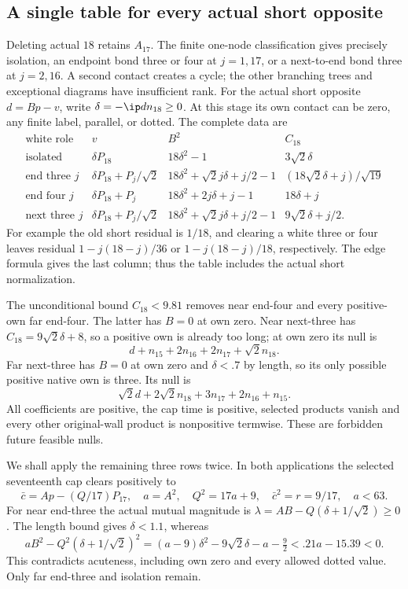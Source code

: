 \subsection{A single table for every actual short opposite}
\label{app:B18shorttable}
Deleting actual \(18\) retains \(A_{17}\).
The finite one-node classification gives precisely isolation, an
endpoint bond three or four at \(j=1,17\), or a next-to-end bond
three at \(j=2,16\). A second contact creates a cycle; the other
branching trees and exceptional diagrams have insufficient rank.
For the actual short opposite \(d=Bp-v\), write
\(\delta=-\ip d{n_{18}}\geq0\). At this stage its own contact
can be zero, any finite label, parallel, or dotted. The complete data are
\[
\begin{array}{c|c|c|c}
\text{white role}&v&B^2&C_{18}\\ \hline
\text{isolated}&\delta P_{18}&18\delta^2-1&3\sqrt2\delta\\
\text{end three }j&\delta P_{18}+P_j/\sqrt2&
18\delta^2+\sqrt2j\delta+j/2-1&
(18\sqrt2\delta+j)/\sqrt{19}\\
\text{end four }j&\delta P_{18}+P_j&
18\delta^2+2j\delta+j-1&18\delta+j\\
\text{next three }j&\delta P_{18}+P_j/\sqrt2&
18\delta^2+\sqrt2j\delta+j/2-1&9\sqrt2\delta+j/2 .
\end{array}
\]
For example the old short residual is \(1/18\), and clearing a
white three or four leaves residual
\(1-j(18-j)/36\) or \(1-j(18-j)/18\), respectively.
The edge formula gives the last column; thus the table includes
the actual short normalization.

The unconditional bound \(C_{18}<9.81\) removes near end-four
and every positive-own far end-four. The latter has \(B=0\)
at own zero. Near next-three has \(C_{18}=9\sqrt2\delta+8\),
so a positive own is already too long; at own zero its null is
\[
 d+n_{15}+2n_{16}+2n_{17}+\sqrt2n_{18}.
\]
Far next-three has \(B=0\) at own zero and \(\delta<.7\)
by length, so its only possible positive native own is three.
Its null is
\[
 \sqrt2d+2\sqrt2n_{18}+3n_{17}+2n_{16}+n_{15}.
\]
All coefficients are positive, the cap time is positive,
selected products vanish and every other original-wall product
is nonpositive termwise. These are forbidden future feasible nulls.

We shall apply the remaining three rows twice. In both applications
the selected seventeenth cap clears positively to
\[
 \bar c=Ap-(Q/17)P_{17},\quad
 a=A^2,\quad Q^2=17a+9,\quad \bar c^2=r=9/17,\quad a<63.
\]
For near end-three the actual mutual magnitude is
\(\lambda=AB-Q(\delta+1/\sqrt2)\geq0\).
The length bound gives \(\delta<1.1\), whereas
\[
 aB^2-Q^2(\delta+1/\sqrt2)^2
 =(a-9)\delta^2-9\sqrt2\delta-a-\tfrac92
 <.21a-15.39<0.
\]
This contradicts acuteness, including own zero and every allowed
dotted value. Only far end-three and isolation remain.

